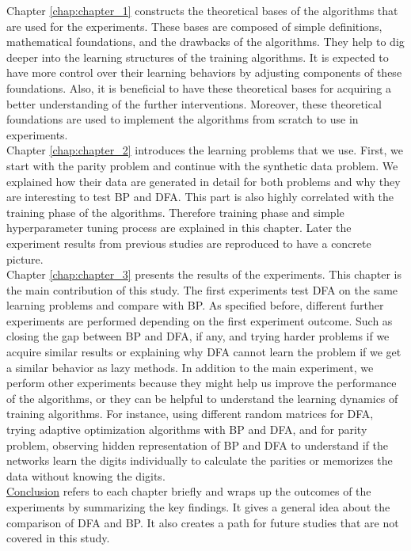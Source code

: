 \documentclass[a4paper, nobind]{templates/ociamthesis}
\begin{document}
Chapter \ref{chap:chapter_1} constructs the theoretical bases of the algorithms that are used for the experiments. These bases are composed of simple definitions, mathematical foundations, and the drawbacks of the algorithms. They help to dig deeper into the learning structures of the training algorithms. It is expected to have more control over their learning behaviors by adjusting components of these foundations. Also, it is beneficial to have these theoretical bases for acquiring a better understanding of the further interventions. Moreover, these theoretical foundations are used to implement the algorithms from scratch to use in experiments.\\
Chapter \ref{chap:chapter_2} introduces the learning problems that we use. First, we start with the parity problem and continue with the synthetic data problem. We explained how their data are generated in detail for both problems and why they are interesting to test BP and DFA. This part is also highly correlated with the training phase of the algorithms. Therefore training phase and simple hyperparameter tuning process are explained in this chapter. Later the experiment results from previous studies \cite{DBLP:journals/corr/abs-2002-07400, chizat2020implicit} are reproduced to have a concrete picture.\\
Chapter \ref{chap:chapter_3} presents the results of the experiments. This chapter is the main contribution of this study. The first experiments test DFA on the same learning problems and compare with BP. As specified before, different further experiments are performed depending on the first experiment outcome. Such as closing the gap between BP and DFA, if any, and trying harder problems if we acquire similar results or explaining why DFA cannot learn the problem if we get a similar behavior as lazy methods. In addition to the main experiment, we perform other experiments because they might help us improve the performance of the algorithms, or they can be helpful to understand the learning dynamics of training algorithms. For instance, using different random matrices for DFA, trying adaptive optimization algorithms with BP and DFA, and for parity problem, observing hidden representation of BP and DFA to understand if the networks learn the digits individually to calculate the parities or memorizes the data without knowing the digits.\\
\protect\hyperlink{conc}{Conclusion} refers to each chapter briefly and wraps up the outcomes of the experiments by summarizing the key findings. It gives a general idea about the comparison of DFA and BP. It also creates a path for future studies that are not covered in this study.
\end{document}
